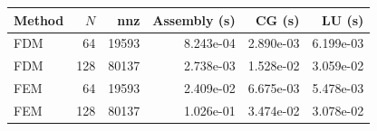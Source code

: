 \begin{tabular}{lrrrrr}
\toprule
Method & $N$ & nnz & Assembly (s) & CG (s) & LU (s)\\
\midrule
FDM & 64 & 19593 & 8.243e-04 & 2.890e-03 & 6.199e-03\\
FDM & 128 & 80137 & 2.738e-03 & 1.528e-02 & 3.059e-02\\
FEM & 64 & 19593 & 2.409e-02 & 6.675e-03 & 5.478e-03\\
FEM & 128 & 80137 & 1.026e-01 & 3.474e-02 & 3.078e-02\\
\bottomrule
\end{tabular}

